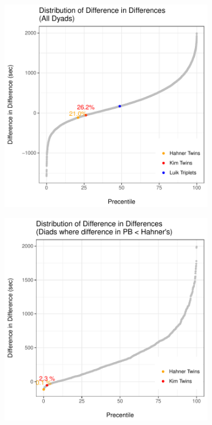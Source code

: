 \documentclass[12pt,titlepage]{article}
\begin{document}
\begin{figure}[!ht]
 \caption{How Hahner Twins Rank in Difference-in-Differences}
 \label{fig:diffdiff}
 \begin{subfigure}{.5\textwidth}
 \includegraphics[width=\textwidth, keepaspectratio]{diff_in_diff_1.pdf}
 \end{subfigure}
 \begin{subfigure}{.5\textwidth}
 \includegraphics[width=\textwidth, keepaspectratio]{diff_in_diff_2.pdf}
 \end{subfigure}
\end{figure}
\end{document}
